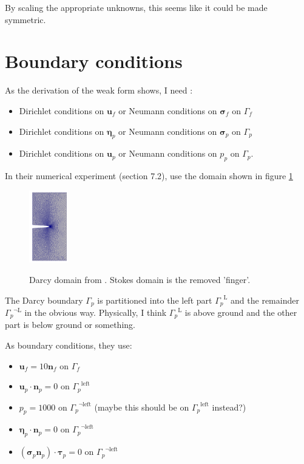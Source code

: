 \documentclass{article}
\newcommand{\mathspace}[1]{\ensuremath{#1}\xspace} %
\newcommand{\sigmabf}{\mathspace{\boldsymbol{\sigma}}}
\newcommand{\taubf}{\mathspace{\boldsymbol{\tau}}}
\newcommand{\stokesbdy}{\mathspace{\Gamma_{f}}}
\newcommand{\darcybdy}{\mathspace{\Gamma_{p}}}
\newcommand{\nf}{\mathspace{\mathbf{n}_f}}
\newcommand{\np}{\mathspace{\mathbf{n}_p}}
\newcommand{\uf}{\mathspace{\mathbf{u}_f}}
\newcommand{\up}{\mathspace{\mathbf{u}_p}}
\newcommand{\pp}{\mathspace{p_p}}
\newcommand{\disp}{\mathspace{\boldsymbol{\eta}_p}}
\begin{document}
By scaling the appropriate unknowns, this seems like it could be made symmetric.


\section{Boundary conditions}
As the derivation of the weak form shows, I need :
\begin{itemize}
\item Dirichlet conditions on \uf or Neumann conditions on
  $\sigmabf_f$ on \stokesbdy
\item Dirichlet conditions on \disp or Neumann %
  conditions on $\sigmabf_p$ on \darcybdy
\item Dirichlet conditions on
  \up or Neumann conditions on \pp on \darcybdy.
\end{itemize}


In their numerical experiment (section 7.2), \cite{ambartsumyan} use the domain shown in figure \ref{fig:ambartsumyandomain}
\begin{figure}[h]
  \centering
  \includegraphics[width=0.15\textwidth]{img/ambartsumyandomain.png}
  \label{fig:ambartsumyandomain}
  \caption{Darcy domain from \cite{ambartsumyan}. Stokes domain is the removed 'finger'.}
\end{figure}
The Darcy boundary \darcybdy is partitioned into the left part $\darcybdy^{\text{L}}$ and the remainder $\darcybdy^{\neg \text{L}}$ in the obvious way. Physically, I think $\darcybdy^{\text{L}}$ is above ground and the other part is below ground or something.

As boundary conditions, they use:
\begin{itemize}
\item $\uf = 10 \nf$ on \stokesbdy
\item $\up \cdot \np = 0$ on $\darcybdy^{\text{left}}$
\item $\pp = 1000$ on $\darcybdy^{\neg \text{left}}$ (maybe this should be on $\darcybdy^{\text{left}}$ instead?)
\item $\disp \cdot \np = 0$ on $\darcybdy^{\neg \text{left}}$
\item $(\sigmabf_p \np) \cdot \taubf_p = 0$ on $\darcybdy^{\neg \text{left}}$


 
\end{itemize}
\end{document}
